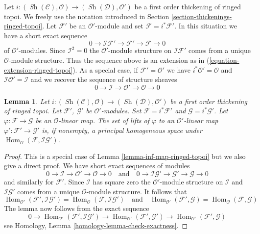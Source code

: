 \documentclass{stacks-project}
\theoremstyle{plain}
\newtheorem{lemma}[subsection]{Lemma}
\theoremstyle{definition}
\theoremstyle{remark}
\numberwithin{equation}{subsection}
\def\Hom{\mathop{\mathrm{Hom}}\nolimits}
\def\Sh{\mathop{\mathit{Sh}}\nolimits}
\begin{document}
\noindent
Let $i : (\Sh(\mathcal{C}), \mathcal{O}) \to (\Sh(\mathcal{D}), \mathcal{O}')$
be a first order thickening of ringed topoi. We freely use the notation
introduced in Section \ref{section-thickenings-ringed-topoi}.
Let $\mathcal{F}'$ be an $\mathcal{O}'$-module
and set $\mathcal{F} = i^*\mathcal{F}'$.
In this situation we have a short exact sequence
$$
0 \to \mathcal{I}\mathcal{F}' \to \mathcal{F}' \to \mathcal{F} \to 0
$$
of $\mathcal{O}'$-modules. Since $\mathcal{I}^2 = 0$ the
$\mathcal{O}'$-module structure on $\mathcal{I}\mathcal{F}'$
comes from a unique $\mathcal{O}$-module structure.
Thus the sequence above is an extension as in
(\ref{equation-extension-ringed-topoi}).
As a special case, if $\mathcal{F}' = \mathcal{O}'$ we have
$i^*\mathcal{O}' = \mathcal{O}$ and
$\mathcal{I}\mathcal{O}' = \mathcal{I}$ and we recover the
sequence of structure sheaves
$$
0 \to \mathcal{I} \to \mathcal{O}' \to \mathcal{O} \to 0
$$

\begin{lemma}
\label{lemma-inf-map-special-ringed-topoi}
Let $i : (\Sh(\mathcal{C}), \mathcal{O}) \to (\Sh(\mathcal{D}), \mathcal{O}')$
be a first order thickening of ringed topoi.
Let $\mathcal{F}'$, $\mathcal{G}'$ be $\mathcal{O}'$-modules.
Set $\mathcal{F} = i^*\mathcal{F}'$ and $\mathcal{G} = i^*\mathcal{G}'$.
Let $\varphi : \mathcal{F} \to \mathcal{G}$ be an $\mathcal{O}$-linear map.
The set of lifts of $\varphi$ to an $\mathcal{O}'$-linear map
$\varphi' : \mathcal{F}' \to \mathcal{G}'$ is, if nonempty, a principal
homogeneous space under
$\Hom_\mathcal{O}(\mathcal{F}, \mathcal{I}\mathcal{G}')$.
\end{lemma}

\begin{proof}
This is a special case of Lemma \ref{lemma-inf-map-ringed-topoi} but we also
give a direct proof. We have short exact sequences of modules
$$
0 \to \mathcal{I} \to \mathcal{O}' \to \mathcal{O} \to 0
\quad\text{and}\quad
0 \to \mathcal{I}\mathcal{G}' \to \mathcal{G}' \to \mathcal{G} \to 0
$$
and similarly for $\mathcal{F}'$.
Since $\mathcal{I}$ has square zero the $\mathcal{O}'$-module
structure on $\mathcal{I}$ and $\mathcal{I}\mathcal{G}'$ comes from
a unique $\mathcal{O}$-module structure. It follows that
$$
\Hom_{\mathcal{O}'}(\mathcal{F}', \mathcal{I}\mathcal{G}') =
\Hom_\mathcal{O}(\mathcal{F}, \mathcal{I}\mathcal{G}')
\quad\text{and}\quad
\Hom_{\mathcal{O}'}(\mathcal{F}', \mathcal{G}) =
\Hom_\mathcal{O}(\mathcal{F}, \mathcal{G})
$$
The lemma now follows from the exact sequence
$$
0 \to \Hom_{\mathcal{O}'}(\mathcal{F}', \mathcal{I}\mathcal{G}') \to
\Hom_{\mathcal{O}'}(\mathcal{F}', \mathcal{G}') \to
\Hom_{\mathcal{O}'}(\mathcal{F}', \mathcal{G})
$$
see Homology, Lemma \ref{homology-lemma-check-exactness}.
\end{proof}
\end{document}
